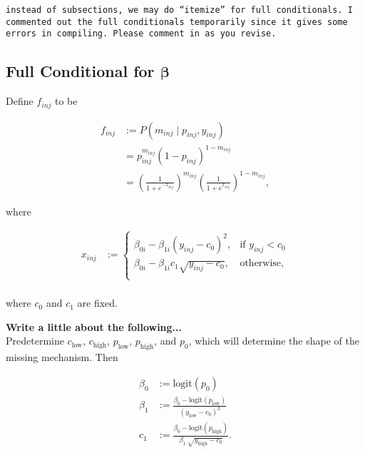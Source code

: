 \documentclass[12pt,]{article}
\def\logit{\text{logit}}
\begin{document}
{\tt instead of subsections, we may do ``itemize'' for full conditionals.  I commented out the full conditionals temporarily since it gives some errors in compiling.  Please comment in as you revise. }




\subsection{\texorpdfstring{Full Conditional for
\(\bm \beta\)}{Full Conditional for \textbackslash{}bm \textbackslash{}beta}}\label{full-conditional-for-bm-beta}

Define \(f_{inj}\) to be

\begin{align*}
f_{inj} &:= P(m_{inj} \mid p_{inj}, y_{inj}) \\
&= p_{inj}^{m_{inj}} (1-p_{inj})^{1 - m_{inj}} \\
&= \left(\frac{1}{1+e^{-x_{inj}}} \right)^{m_{inj}}\left(\frac{1}{1+e^{x_{inj}}} \right)^{1-m_{inj}},
\end{align*}

where

\begin{align*}
  x_{inj} &:= \begin{cases}
  \beta_{0i} - \beta_{1i}(y_{inj}-c_0)^2, & \text{if } y_{inj} < c_0\nonumber \\
  \beta_{0i} - \beta_{1i}c_1\sqrt{y_{inj}-c_0}, & \text{otherwise}, \nonumber \\
  \end{cases}\\
\end{align*}

where \(c_0\) and \(c_1\) are fixed.

\textbf{Write a little about the following...} \\
Predetermine $c_\text{low}$, $c_\text{high}$, $p_\text{low}$, $p_\text{high}$, and
$p_0$, which will determine the shape of the missing mechanism. Then

\begin{align*}
  \beta_0 &:= \logit(p_0) \\
  \beta_1 &:= \frac{\beta_0 - \logit(p_\text{low})}{(y_\text{low} - c_0)^2} \\
  c_1 &:= \frac{\beta_0 - \logit(p_\text{high})}{\beta_1 ~ \sqrt{y_\text{high} - c_0} }. \\
\end{align*}
\end{document}
